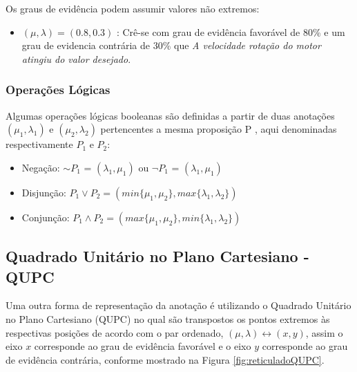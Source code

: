 Os graus de evidência podem assumir valores não extremos:

\begin{itemize}
\item 
$(\mu, \lambda ) = (0.8,0.3)$ : Crê-se com grau de evidência favorável de 80\% e um grau de evidencia contrária de 30\%  que \emph{A velocidade rotação do motor atingiu do valor desejado}.
\end{itemize}

\subsubsection{Operações Lógicas}

Algumas operações lógicas booleanas são definidas 
a partir de duas anotações 
$(\mu _1, \lambda _1)$ e $(\mu _2, \lambda _2)$ 
pertencentes a mesma proposição P 
\cite{JISFeAS} \cite{Abe2014},
aqui denominadas respectivamente $P_1$ e $P_2$:

\begin{itemize}

\item Negação: $\sim$$P _1$ = $(\lambda _1, \mu _1)$ ou 
$\neg$$P _1$ = $(\lambda _1, \mu _1)$

\item Disjunção: $P _1 \vee P _2 = 
(min\{\mu _1, \mu _2\},max\{\lambda _1, \lambda _2\})$ 

\item Conjunção: $P _1 \wedge P _2 = 
(max\{\mu _1, \mu _2\},min\{\lambda _1, \lambda _2\})$ 


\end{itemize}




\subsection{Quadrado Unitário no Plano Cartesiano - QUPC}

Uma outra forma de representação da anotação é utilizando o Quadrado Unitário no Plano Cartesiano (QUPC) no qual são transpostos os pontos extremos às respectivas posições de acordo com o par ordenado,  $(\mu, \lambda ) \leftrightarrow (x,y) $, assim o eixo $x$ corresponde ao grau de evidência favorável e o eixo $y$ corresponde ao grau de evidência contrária, conforme mostrado na Figura \ref{fig:reticuladoQUPC}.




